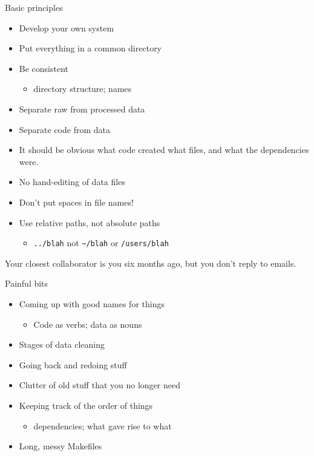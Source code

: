 \documentclass[12pt,t]{beamer}
\newcommand{\bi}{\begin{itemize}}
\newcommand{\ei}{\end{itemize}}
\begin{document}
\begin{frame}{Basic principles}

\vspace{6pt}

\bi
\item Develop your own system
\item Put everything in a common directory
\item Be consistent
\bi
\item directory structure; names
\ei
\item Separate raw from processed data
\item Separate code from data
\item It should be obvious what code created what files, and what the
  dependencies were.
\item No hand-editing of data files
\item Don't put spaces in file names!
\item Use relative paths, not absolute paths
\bi
\item {\tt ../blah} not {\tt {\textasciitilde}/blah} or {\tt /users/blah}
\ei
\ei

\end{frame}


\begin{frame}[c]{}

\centering
\large
Your closest collaborator is you six months ago, but you
don't reply to emails.
\end{frame}


\begin{frame}{Painful bits}

\vspace{6pt}

\bi
\item Coming up with good names for things
\bi
\item Code as verbs; data as nouns
\ei
\item Stages of data cleaning
\item Going back and redoing stuff
\item Clutter of old stuff that you no longer need
\item Keeping track of the order of things
\bi
\item dependencies; what gave rise to what
\ei
\item Long, messy Makefiles
\ei

\note{
}
\end{frame}
\end{document}
